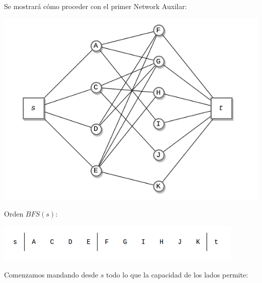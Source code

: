 \documentclass[10pt,a4paper]{article}
\begin{document}
Se mostrará cómo proceder con el primer Network Auxilar:

\begin{center}

    \begin{adjustbox}{max size={\textwidth}{\textheight}}
        \includegraphics{definitions/wave_1.jpg}
        \end{adjustbox}
    
\end{center}

Orden $BFS(s)$:

\begin{center}

    \begin{adjustbox}{max size={\textwidth}{\textheight}}
        \includegraphics{definitions/wave_b1.jpg}
        \end{adjustbox}
    
\end{center}

Comenzamos mandando desde $s$ todo lo que la capacidad de los lados permite:
\end{document}

